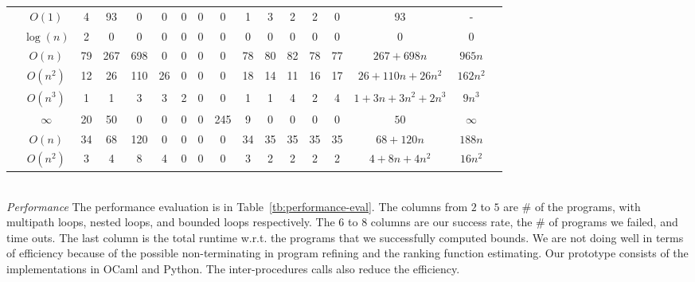 \begin{table}[ht]
{\begin{tabular}{ >{\scriptsize}c | >{\scriptsize}c | >{\scriptsize}c | >{\scriptsize}c | c | c | c | c | c | c | c | c | c | c | c | c | c |}
 \hline \hline
 \multirow{6}{*}{Icra} 
 & $O(1)$ & 4 & 93 & 0 & 0 & 0 & 0 & 0 & 1 & 3 & 2 & 2 & 0 & 93 & - \\
 \cline{2-2}
 & $\log(n)$ & 2 & 0 & 0 & 0 & 0 & 0 & 0 & 0 & 0 & 0 & 0 & 0 & 0 & 0 \\
 \cline{2-2}
 & $O(n)$ & 79 & 267 & 698 & 0 & 0 & 0 & 0 & 78 & 80 & 82 & 78 & 77 & $267 + 698n$ & $ 965n $\\
 \cline{2-2}
 & $O(n^2)$ & 12 & 26 & 110 & 26 & 0 & 0 & 0 & 18 & 14 & 11 & 16 & 17 & $26+110n+26n^2$ & $162n^2$\\
 \cline{2-2}
 & $O(n^3)$ & 1 & 1 & 3 & 3 & 2 & 0 & 0 & 1 & 1 & 4 & 2 & 4 & $1+3n+3n^2+2n^3$ & $9n^3$\\
 \cline{2-2}
 & $\infty$ & 20 &  50 & 0 & 0 & 0 & 0 & 245 & 9 & 0 & 0 & 0 & 0 & $50$ & $ \infty$\\
 \hline \hline
 \multirow{2}{*}{Tianhan} 
 & $O(n)$ & 34 & 68 & 120 & 0 & 0 & 0 & 0 & 34 & 35 & 35 & 35 & 35 & $68+120n$ & $188n$\\
 \cline{2-2}
 & $O(n^2)$ & 3 & 4 & 8 & 4 & 0 & 0 & 0 & 3 & 2 & 2 & 2 & 2 & $4+8n+4n^2$ & $16n^2$ \\
 \hline
 \end{tabular}
 }
 \vspace{-0.5cm}
 \end{table}
%
\\
\emph{Performance}
The performance evaluation is in Table~\ref{tb:performance-eval}.
The columns from $2$ to $5$ are $\# $ of the programs, with multipath loops, nested loops, and bounded loops respectively.
The $6$ to $8$ columns are our success rate, the \# of programs we failed, and time outs. The last column is the total runtime w.r.t. the programs that we successfully computed bounds.
We are not doing well in terms of efficiency because of the possible non-terminating in program refining and the ranking function estimating.
Our prototype consists of the implementations in OCaml and Python.
The inter-procedures calls also reduce the efficiency.
%
%
